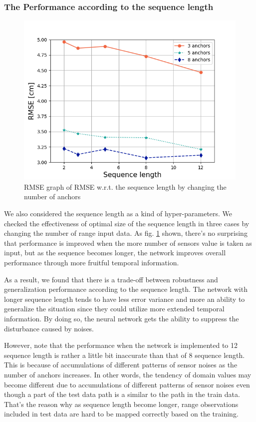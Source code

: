 \documentclass[letterpaper, 10 pt, conference]{ieeeconf}  %
\begin{document}
\subsubsection{The Performance according to the sequence length}

\begin{figure}[h!]
	\centering
	\includegraphics[width=0.9\linewidth]{image/RMSE_error}
	\caption{RMSE graph of RMSE w.r.t. the sequence length by changing the number of anchors}
	\label{fig:seq_length_on_different_anchors} 	
\end{figure}

We also considered the sequence length as a kind of hyper-parameters. We checked the effectiveness of optimal size of the sequence length in three cases by changing the number of range input data. As fig. \ref{fig:seq_length_on_different_anchors} shown, there's no surprising that performance is improved when the more number of sensors value is taken as input, but as the sequence becomes longer, the network improves overall performance through more fruitful temporal information.

As a result, we found that there is a trade-off between robustness and generalization performance according to the sequence length. The network with longer sequence length tends to have less error variance and more an ability to generalize the situation since they could utilize more extended temporal information. By doing so, the neural network gets the ability to suppress the disturbance caused by noises. 

However, note that the performance when the network is implemented to 12 sequence length is rather a little bit inaccurate than that of 8 sequence length. This is because of accumulations of different patterns of sensor noises as the number of anchors increases. In other words, the tendency of domain values may become different due to accumulations of different patterns of sensor noises even though a part of the test data path is a similar to the path in the train data. That's the reason why as sequence length become longer, range observations included in test data are hard to be mapped correctly based on the training.
\end{document}
